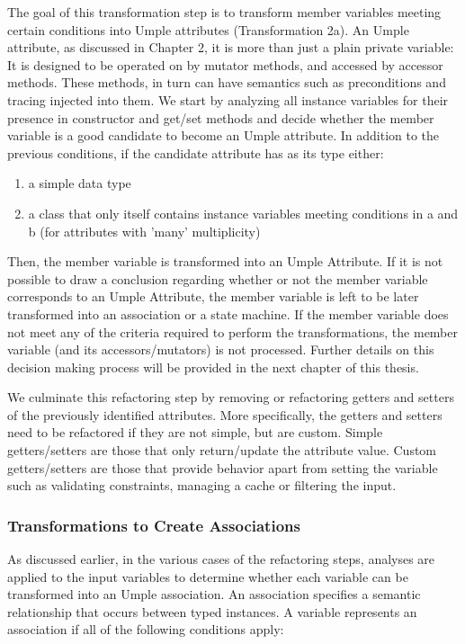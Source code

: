 The goal of this transformation step is to transform member variables meeting certain conditions into Umple attributes (Transformation 2a). An Umple attribute, as discussed in Chapter 2, it is more than just a plain private variable: It is designed to be operated on by mutator methods, and accessed by accessor methods. These methods, in turn can have semantics such as preconditions and tracing injected into them. 
We start by analyzing all instance variables for their presence in constructor and get/set methods and decide whether the member variable is a good candidate to become an Umple attribute. In addition to the previous conditions, if the candidate attribute has as its type either: 
\begin{enumerate}
\item a simple data type
\item a class that only itself contains instance variables meeting conditions in a and b (for attributes with 'many' multiplicity)
\end{enumerate}

Then, the member variable is transformed into an Umple Attribute. If it is not possible to draw a conclusion regarding whether or not the member variable corresponds to an Umple Attribute, the member variable is left to be later transformed into an association or a state machine. If the member variable does not meet any of the criteria required to perform the transformations, the member variable (and its accessors/mutators) is not processed. Further details on this decision making process will be provided in the next chapter of this thesis. 

We culminate this refactoring step by removing or refactoring getters and setters of the previously identified attributes. More specifically, the getters and setters need to be refactored if they are not simple, but are custom. Simple getters/setters are those that only return/update the attribute value.  Custom getters/setters are those that provide behavior apart from setting the variable such as validating constraints, managing a cache or filtering the input.

\subsubsection{Transformations to Create Associations}

As discussed earlier, in the various cases of the refactoring steps, analyses are applied to the input variables to determine whether each variable can be transformed into an Umple association. An association specifies a semantic relationship that occurs between typed instances. A variable represents an association if all of the following conditions apply:

